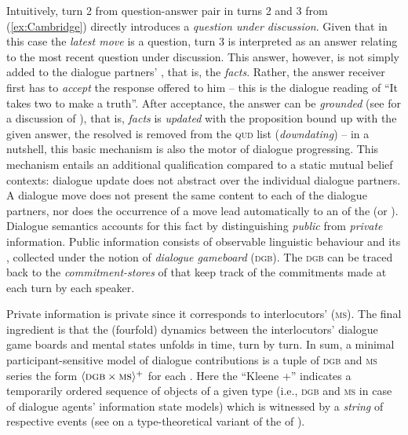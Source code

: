 \documentclass[output=paper]{langsci/langscibook}
\begin{document}
Intuitively, turn 2 from question-answer pair in turns 2 and 3 from (\ref{ex:Cambridge}) directly introduces a \emph{question under discussion}.
%
Given that in this case the \emph{latest move} is a question, turn 3 is interpreted as an answer relating to the most recent question under discussion.
%
This answer, however, is not simply added to the dialogue partners' , that is, the \emph{facts}.
%
Rather, the answer receiver first has to \emph{accept}  the response offered to him -- this is the dialogue reading of \enquote{It takes two to make a truth}.
%
After acceptance, the answer can be \emph{grounded}  (see \citet[Chap.~4]{Clark:1996} for a discussion of ), that is, \emph{facts} is \emph{updated}  with the proposition bound up with the given answer, the resolved  is removed from the \textsc{qud} list (\emph{downdating})  -- in a nutshell, this basic mechanism is also the motor of dialogue progressing. 
%
This mechanism entails an additional qualification compared to a static mutual belief contexts: dialogue update does not abstract over the individual dialogue partners.
%
A dialogue move does not present the same content to each of the dialogue partners, nor does the occurrence of a move lead automatically to an  of the  (or ).
%
Dialogue semantics accounts for this fact by distinguishing \emph{public}  from \emph{private} information.  
%
Public information consists of observable linguistic behaviour and its , collected under the notion of \emph{dialogue gameboard} (\textsc{dgb}). 
%
The \textsc{dgb} can be traced back to the \emph{commitment-stores}  of \citet{Hamblin:1970} that keep track of the commitments made at each turn by each speaker. 

Private information is private since it corresponds to interlocutors'  (\textsc{ms}).
%
The final ingredient is that the (fourfold) dynamics between the interlocutors' dialogue game boards and mental states unfolds in time, turn by turn.
%
In sum, a minimal participant-sensitive model of dialogue contributions is a tuple of \textsc{dgb} and \textsc{ms} series the form $\langle \textsc{dgb} \times \textsc{ms} \rangle^+$ for each . 
%
Here the \enquote{Kleene +} indicates a temporarily ordered sequence of objects of a given type (i.e., \textsc{dgb} and \textsc{ms} in case of dialogue agents' information state models)  which is witnessed by a \emph{string} of respective events (see \citet[Sec.~2.7]{Cooper:Ginzburg:2015} on a type-theoretical variant of the  of \citet{Fernando:2011}).
\end{document}

